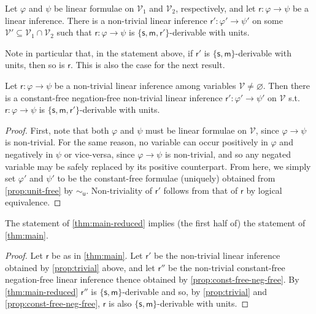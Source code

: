 \documentclass[a4paper, UKenglish, cleveref]{lipics-v2021}
\renewcommand{\phi}{\varphi}
\renewcommand{\emptyset}{\varnothing}
\newcommand{\V}{\ensuremath{\mathcal{V}}}
\newcommand{\m}{\ensuremath{\mathsf{m}}}
\newcommand{\s}{\ensuremath{\mathsf{s}}}
\newcommand{\un}{\ensuremath{\mathsf{u}}}
\begin{document}
\begin{proposition}
  \label{prop:trivial}
  Let $\phi$ and $\psi$ be linear formulae on $\V_1$ and $\V_2$, respectively,
  and let \(\mathsf r : \phi \to \psi\) be a linear inference.
  There is a non-trivial linear inference \(\mathsf r' : \phi' \to \psi'\) on some $\V' \subseteq \V_1 \cap \V_2$ such that $\mathsf r : \phi \to \psi$ is $\{\s,\m,\mathsf r' \}$-derivable with units.
\end{proposition}
%
%
%

Note in particular that, in the statement above, if $\mathsf r'$ is $\{\s,\m \}$-derivable with units, then so is $\mathsf r$.
This is also the case for the next result.

\begin{proposition}
  \label{prop:const-free-neg-free}
  Let \(\mathsf r: \phi \to \psi\) be a non-trivial linear inference among variables $\V \neq \emptyset$.
  Then there is a constant-free negation-free non-trivial linear inference \(\mathsf r' : \phi' \to \psi'\) on $\V$
  s.t.\ $\mathsf r: \phi \to \psi$ is $\{\s,\m,\mathsf r' \}$-derivable with units.
%
\end{proposition}
\begin{proof}
  First, note that both $\phi$ and $\psi$ must be linear formulae on $\V$, since $\phi \to \psi$ is non-trivial.
  For the same reason, no variable can occur positively in $\phi$ and negatively in $\psi$ or vice-versa, since $\phi \to \psi$ is non-trivial, and so any negated variable may be safely replaced by its positive counterpart.
%
From here, we simply set $\phi'$ and $\psi' $ to be the constant-free formulae (uniquely) obtained from \cref{prop:unit-free} by $\sim_\un$.
Non-triviality of $\mathsf r'$ follows from that of $\mathsf r$ by logical equivalence.
%
%
\end{proof}

\begin{corollary}\label{cor:main-red-to-main}
  The statement of \cref{thm:main-reduced} implies (the first half of) the statement of \cref{thm:main}.
\end{corollary}
\begin{proof}
Let $\mathsf r$ be as in \cref{thm:main}.
Let $\mathsf r'$ be the non-trivial linear inference obtained by \cref{prop:trivial} above, and let $\mathsf r''$ be the non-trivial constant-free negation-free linear inference thence obtained by \cref{prop:const-free-neg-free}.
By \cref{thm:main-reduced} $\mathsf r''$ is $\{\s,\m \}$-derivable and so, by \cref{prop:trivial} and \cref{prop:const-free-neg-free}, $\mathsf r$ is also $\{\s,\m \}$-derivable with units.
\end{proof}
%
%
%
%
%
\end{document}
